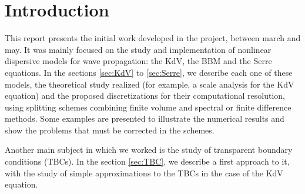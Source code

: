 \section{Introduction}

\indent This report presents the initial work developed in the project, between march and may. It was mainly focused on the study and implementation of nonlinear dispersive models for wave propagation: the KdV, the BBM and the Serre equations. In the sections \ref{sec:KdV} to \ref{sec:Serre}, we describe each one of these models, the theoretical study realized (for example, a scale analysis for the KdV equation) and the proposed discretizations for their computational resolution, using splitting schemes combining finite volume and spectral or finite difference methods. Some examples are presented to illustrate the numerical results and show the problems that must be corrected in the schemes.

\indent Another main subject in which we worked is the study of transparent boundary conditions (TBCs). In the section \ref{sec:TBC}, we describe a first approach to it, with the study of simple approximations to the TBCs in the case of the KdV equation.